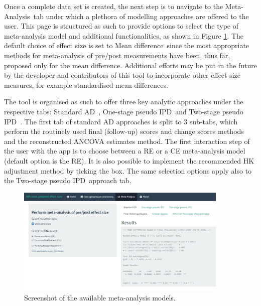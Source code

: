 \documentclass[AMA,STIX1COL]{WileyNJD-v2}
\begin{document}
Once a complete data set is created, the next step is to navigate to the \textquotesingle Meta-Analysis\textquotesingle\ tab under which a plethora of modelling approaches are offered to the user. This page is structured as such to provide options to select the type of meta-analysis model and additional functionalities, as shown in Figure \ref{fig:shiny-choose_analysis}.
The default choice of effect size is set to \textquotesingle Mean difference\textquotesingle\, since the most appropriate methods for meta-analysis of pre/post measurements have been, thus far, proposed only for the mean difference. Additional efforts may be put in the future by the developer and contributors of this tool to incorporate other effect size measures, for example standardised mean differences.

The tool is organised as such to offer three key analytic approaches under the respective tabs: \textquotesingle Standard AD\textquotesingle\ ,  \textquotesingle One-stage pseudo IPD\textquotesingle\ and \textquotesingle Two-stage pseudo IPD\textquotesingle\ . The first tab of standard AD approaches is split to 3 sub-tabs, which perform the routinely used final (follow-up) scores and change scores methods and the reconstructed ANCOVA estimates method. The first interaction step of the user with the app is to choose between a RE or a CE meta-analysis model (default option is the RE). It is also possible to implement the recommended HK \citep{HartungJ.Knapp2001, sidik2002simple} adjustment method by ticking the box. The same selection options apply also to the \textquotesingle Two-stage pseudo IPD\textquotesingle\ approach tab.

\begin{figure}[ht]
  \centering \includegraphics[width=0.9\textwidth]{analysis_options.JPG}
    \caption{\small {Screenshot of the available meta-analysis models.}} \label{fig:shiny-choose_analysis}
\end{figure}
\end{document}
